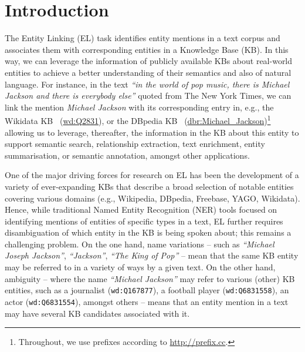 \documentclass{llncs}
\begin{document}
\section{Introduction} 
\label{sec:intro}


The Entity Linking (EL) task identifies entity mentions in a text corpus and associates them with corresponding entities in a Knowledge Base (KB). In this way, we can leverage the information of publicly available KBs about real-world entities to achieve a better understanding of their semantics and also of natural language. For instance, in the text \textit{``in the world of pop music, there is Michael Jackson and there is everybody else''} quoted from The New York Times, we can link the mention \textit{Michael Jackson} with its corresponding entry in, e.g., the Wikidata KB~\cite{Wikidata_vrandevcic2014wikidata} (\url{wd:Q2831}), or the DBpedia KB~\cite{dbpedia-lehmann2015dbpedia} (\url{dbr:Michael_Jackson})\footnote{Throughout, we use prefixes according to \url{http://prefix.cc}.} allowing us to leverage, thereafter, the information in the KB about this entity to support semantic search, relationship extraction, text enrichment, entity summarisation, or semantic annotation, amongst other applications.

One of the major driving forces for research on EL has been the development of a variety of ever-expanding KBs that describe a broad selection of notable entities covering various domains (e.g., Wikipedia, DBpedia, Freebase, YAGO, Wikidata). Hence, while traditional Named Entity Recognition (NER) tools focused on identifying mentions of entities of specific types in a text, EL further requires disambiguation of which entity in the KB is being spoken about; this remains a challenging problem. On the one hand, name variations -- such as \textit{``Michael Joseph Jackson''}, \textit{``Jackson''}, \textit{``The King of Pop''} -- mean that the same KB entity may be referred to in a variety of ways by a given text. On the other hand, ambiguity -- where the name \textit{``Michael Jackson''} may refer to various (other) KB entities, such as a journalist (\texttt{wd:Q167877}), a football player (\texttt{wd:Q6831558}), an actor (\texttt{wd:Q6831554}), amongst others -- means that an entity mention in a text may have several KB candidates associated with it.
\end{document}
